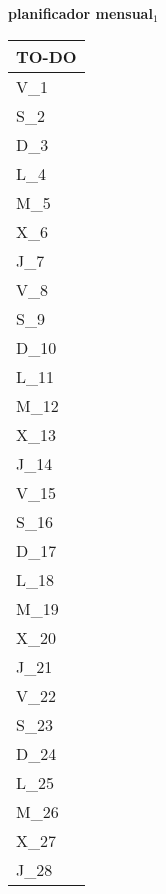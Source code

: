 \clearpage
\raggedright{
	\fontsize{25}{50}\selectfont
	\textbf{\NextYear}
}\scriptsize{\textbf{planificador mensual$_1$}}\\[11.3pt]



	\noindent\dotfill
	\renewcommand{\arraystretch}{1.5}\scriptsize
		\begin{longtabu} to \textwidth { X[l]}
		\centering \small{\textbf{TO-DO}} \\
		\toprule
		V_{1} \dotfill\\
		S_{2} \dotfill\\
		D_{3} \dotfill\\
		\hline
		L_{4} \dotfill\\
		M_{5} \dotfill\\
		X_{6} \dotfill\\
		J_{7} \dotfill\\
		V_{8} \dotfill\\
		S_{9} \dotfill\\
		D_{10} \dotfill\\
		\hline
		L_{11} \dotfill\\
		M_{12} \dotfill\\
		X_{13} \dotfill\\
		J_{14} \dotfill\\
		V_{15} \dotfill\\
		S_{16} \dotfill\\
		D_{17} \dotfill\\
		\hline
		L_{18} \dotfill\\
		M_{19} \dotfill\\
		X_{20} \dotfill\\
		J_{21} \dotfill\\
		V_{22} \dotfill\\
		S_{23} \dotfill\\
		D_{24} \dotfill\\
		\hline
		L_{25} \dotfill\\
		M_{26} \dotfill\\
		X_{27} \dotfill\\
		J_{28} \dotfill\\

		\bottomrule

	\end{longtabu}


\clearpage
